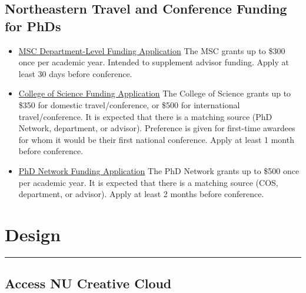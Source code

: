 \documentclass[
  letterpaper,
  DIV=11,
  numbers=noendperiod]{scrreprt}
\begin{document}
\hypertarget{northeastern-travel-and-conference-funding-for-phds}{%
\section*{\texorpdfstring{\textbf{Northeastern Travel and Conference
Funding for
PhDs}}{Northeastern Travel and Conference Funding for PhDs}}\label{northeastern-travel-and-conference-funding-for-phds}}


\begin{itemize}
\item
  \href{https://drive.google.com/file/d/1Lb_1kdAgfSQqCOqkyCWnVshKLY8Y7MHT/view?usp=sharing}{MSC
  Department-Level Funding Application} The MSC grants up to \$300 once
  per academic year. Intended to supplement advisor funding. Apply at
  least 30 days before conference.
\item
  \href{https://forms.office.com/pages/responsepage.aspx?id=gcLuqKOqrk2sm5o5i5IV5yDZoNSxGVNDmDTVJk5ayVFURVRETTY1MUZUUDIzNzRHVFRGQkpaWTBZTi4u}{College
  of Science Funding Application} The College of Science grants up to
  \$350 for domestic travel/conference, or \$500 for international
  travel/conference. It is expected that there is a matching source (PhD
  Network, department, or advisor). Preference is given for first-time
  awardees for whom it would be their first national conference. Apply
  at least 1 month before conference.
\item
  \href{https://phd.northeastern.edu/network/resources/travelfunding/}{PhD
  Network Funding Application} The PhD Network grants up to \$500 once
  per academic year. It is expected that there is a matching source
  (COS, department, or advisor). Apply at least 2 months before
  conference.\\
\end{itemize}

\hypertarget{design}{%
\chapter{Design}\label{design}}

\begin{center}\rule{0.5\linewidth}{0.5pt}\end{center}

\hypertarget{access-nu-creative-cloud}{%
\section*{\texorpdfstring{\textbf{Access NU Creative
Cloud}}{Access NU Creative Cloud}}\label{access-nu-creative-cloud}}
\end{document}
